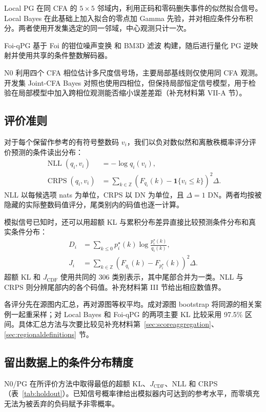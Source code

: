 \documentclass[10pt,twocolumn,journal]{IEEEtran}
\DeclareMathOperator{\NLL}{NLL}
\DeclareMathOperator{\CRPS}{CRPS}
\begin{document}
Local PG 在同 CFA 的 $5\times5$ 邻域内，利用正码和零码删失事件的似然拟合信号。Local Bayes 在此基础上加入拟合的零点加 Gamma 先验，并对相应条件分布积分。两者使用开发集选定的同一邻域，中心观测只计一次。

Foi-qPG 基于 Foi 的钳位噪声变换 \cite{foi2009} 和 BM3D 滤波 \cite{bm3d} 构建，随后进行量化 PG 逆映射并使用共享的条件整数解码器。

N0 利用四个 CFA 相位估计多尺度信号场，主要局部基线则仅使用同 CFA 观测。开发集 Joint-CFA Bayes 对照也使用四相位，但保持局部恒定信号模型，用于检验在局部模型中加入跨相位观测能否缩小误差差距（补充材料第 VII-A 节）。

\subsection{评价准则}
对于每个保留作参考的有符号整数码 $v_i$，我们以负对数似然和离散秩概率评分评价预测的条件读出分布：
\begin{align}
\NLL(q_i,v_i)&=-\log q_i(v_i),\label{eq:nll}\\
\CRPS(q_i,v_i)&=\sum_{k\in\mathbb Z}
\left(F_{q_i}(k)-\mathbf{1}\{v_i\leq k\}\right)^2\Delta.\label{eq:crps}
\end{align}
NLL 以每候选项 nats 为单位，CRPS 以 DN 为单位，且 $\Delta=1$ DN。两者均按被隐藏的实际整数码值评分，尾类别内的码值也逐一计算。

模拟信号已知时，还可以用超额 KL 与累积分布差异直接比较预测条件分布和真实条件分布：
\begin{align}
D_i&=\sum_{k\leq0}p^{\star}_i(k)\log\frac{p^{\star}_i(k)}{q_i(k)},\label{eq:kl}\\
J_i&=\sum_{k\in\mathbb Z}\left(F_{q_i}(k)-F_{p^{\star}_i}(k)\right)^2\Delta.\label{eq:cdf}
\end{align}
超额 KL 和 $J_{\mathrm{CDF}}$ 使用共同的 306 类别表示，其中尾部合并为一类。NLL 与 CRPS 则分辨尾部内的各个码值。补充材料第 III 节给出相应数值界。

各评分先在源图内汇总，再对源图等权平均。成对源图 bootstrap 将同源的相关案例一起重采样；对 Local Bayes 和 Foi-qPG 的两项主要 KL 比较采用 97.5\% 区间。具体汇总方法与次要比较见补充材料第~\ref{sec:scoreaggregation}、\ref{sec:regionaldefinitions} 节。

\subsection{留出数据上的条件分布精度}
N0/PG 在所评价方法中取得最低的超额 KL、$J_{\mathrm{CDF}}$、NLL 和 CRPS（表~\ref{tab:holdout}）。已知信号概率律给出模拟器内可达到的参考水平，而零填充无法为被丢弃的负码赋予非零概率。
\end{document}
